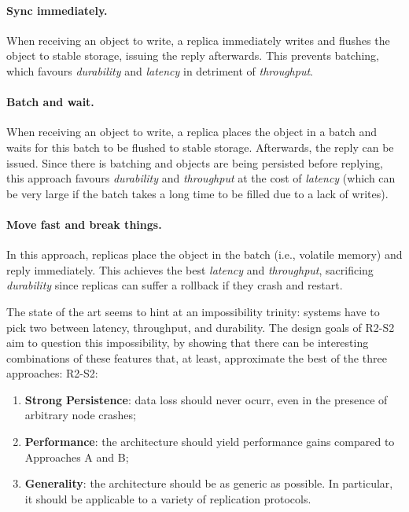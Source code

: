 \paragraph{Sync immediately.} When receiving an object to write, a
replica immediately writes and flushes the object to stable
storage, issuing the reply afterwards. This prevents batching,
which favours \emph{durability} and \emph{latency} in detriment
of \emph{throughput}.

\paragraph{Batch and wait.} When receiving an object to write, a
replica places the object in a batch and waits for this batch to
be flushed to stable storage. Afterwards, the reply can be
issued. Since there is batching and objects are being persisted
before replying, this approach favours \emph{durability} and
\emph{throughput} at the cost of \emph{latency} (which can be
very large if the batch takes a long time to be filled due to a
lack of writes).

\paragraph{Move fast and break things.} In this approach,
replicas place the object in the batch (i.e., volatile memory)
and reply immediately. This achieves the best \emph{latency} and
\emph{throughput}, sacrificing \emph{durability} since replicas
can suffer a rollback if they crash and restart.

The state of the art seems to hint at
an impossibility trinity: systems have to pick two between latency,
throughput, and durability. The design goals of \ac{R2-S2} aim to question this
impossibility, by showing that there can be interesting
combinations of these features that, at least, approximate the
best of the three approaches:
\ac{R2-S2}:
\begin{enumerate}
    \item \textbf{Strong Persistence}: data loss should never
        ocurr, even in the presence of arbitrary node crashes;

    \item \textbf{Performance}: the architecture should yield
        performance gains compared to
        Approaches A and B\@;
    \item \textbf{Generality}: the architecture should be as
        generic as possible. In particular, it should be
        applicable to a variety of replication protocols.
\fi
\end{enumerate}

